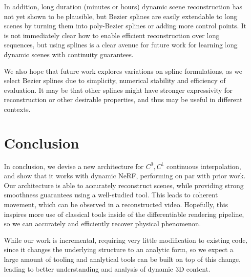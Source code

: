 In addition, long duration (minutes or hours) dynamic scene reconstruction has not yet shown to be plausible, but Bezier splines are easily extendable to long scenes by turning them into poly-Bezier splines or adding more control points. It is not immediately clear how to enable efficient reconstruction over long sequences, but using splines is a clear avenue for future work for learning long dynamic scenes with continuity guarantees.

We also hope that future work explores variations on spline formulations, as we select
Bezier splines due to simplicity, numerical stability and efficiency of evaluation. It may be that other splines might have stronger expressivity for reconstruction or other desirable properties, and thus may be useful in different contexts.

\section*{Conclusion}

In conclusion, we devise a new architecture for $C^0, C^1$ continuous interpolation, and show that it works with dynamic NeRF, performing on par with prior work. Our architecture is able to accurately reconstruct scenes, while providing strong smoothness guarantees using a well-studied tool. This leads to coherent movement, which can be observed in a reconstructed video. Hopefully, this inspires more use of classical tools inside of the differentiable rendering pipeline, so we can accurately and efficiently recover physical phenomenon.

While our work is incremental, requiring very little modification to existing code, since it changes the underlying structure to an analytic form, so we expect a large amount of tooling and analytical tools can be built on top of this change, leading to better understanding and analysis of dynamic 3D content.

\iffalse
\section*{Acknowledgements}

Thanks to Elliot Cuzzillo and Seung-Hwan Baek for helping proofread this work.
\fi